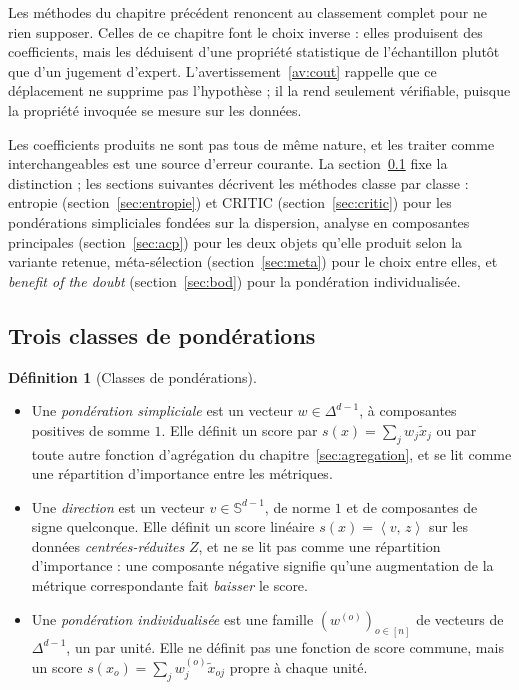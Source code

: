 \documentclass[11pt,a4paper]{article}
\theoremstyle{definition}
\newtheorem{definition}{Définition}[section]
\theoremstyle{remark}
\newcommand{\Sphere}{\mathbb{S}}
\newcommand{\scal}[2]{\left\langle #1 ,\, #2 \right\rangle}
\newcommand{\simplex}{\Delta^{d-1}}
\begin{document}
\medskip

Les méthodes du chapitre précédent renoncent au classement complet pour ne rien supposer.
Celles de ce chapitre font le choix inverse : elles produisent des coefficients, mais les
déduisent d'une propriété statistique de l'échantillon plutôt que d'un jugement
d'expert. L'avertissement~\ref{av:cout} rappelle que ce déplacement ne supprime pas
l'hypothèse ; il la rend seulement vérifiable, puisque la propriété invoquée se mesure sur
les données.

\bigskip

Les coefficients produits ne sont pas tous de même nature, et les traiter comme
interchangeables est une source d'erreur courante. La section~\ref{sec:classes-poids}
fixe la distinction ; les sections suivantes décrivent les méthodes classe par classe :
entropie (section~\ref{sec:entropie}) et CRITIC (section~\ref{sec:critic}) pour les
pondérations simpliciales fondées sur la dispersion, analyse en composantes principales
(section~\ref{sec:acp}) pour les deux objets qu'elle produit selon la variante retenue,
méta-sélection (section~\ref{sec:meta}) pour le choix entre elles, et \emph{benefit of
the doubt} (section~\ref{sec:bod}) pour la pondération individualisée.

\bigskip

\subsection{Trois classes de pondérations}
\label{sec:classes-poids}

\medskip

\begin{definition}[Classes de pondérations]
  \label{def:classes-poids}
  \

  \medskip

  \begin{itemize}[nosep,leftmargin=1.4em]
    \item Une \emph{pondération simpliciale} est un vecteur $w \in \simplex$, à
    composantes positives de somme $1$. Elle définit un score par
    $s(x) = \sum_j w_j \tilde{x}_j$ ou par toute autre fonction d'agrégation du
    chapitre~\ref{sec:agregation}, et se lit comme une répartition d'importance entre les
    métriques.
    \item Une \emph{direction} est un vecteur $v \in \Sphere^{d-1}$, de norme $1$ et de
    composantes de signe quelconque. Elle définit un score linéaire
    $s(x) = \scal{v}{z}$ sur les données \emph{centrées-réduites} $Z$, et ne se lit pas
    comme une répartition d'importance : une composante négative signifie qu'une
    augmentation de la métrique correspondante fait \emph{baisser} le score.
    \item Une \emph{pondération individualisée} est une famille
    $(w^{(o)})_{o \in [n]}$ de vecteurs de $\simplex$, un par unité. Elle ne définit pas
    une fonction de score commune, mais un score $s(x_o) = \sum_j w^{(o)}_j
    \tilde{x}_{oj}$ propre à chaque unité.
  \end{itemize}
\end{definition}
\end{document}
